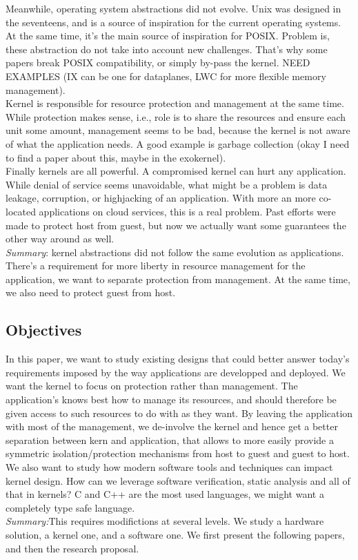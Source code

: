 Meanwhile, operating system abstractions did not evolve.
Unix was designed in the seventeens, and is a source of inspiration for the current operating systems.
At the same time, it's the main source of inspiration for POSIX.
Problem is, these abstraction do not take into account new challenges.
That's why some papers break POSIX compatibility, or simply by-pass the kernel.
NEED EXAMPLES (IX can be one for dataplanes, LWC for more flexible memory management).\\

Kernel is responsible for resource protection and management at the same time.
While protection makes sense, i.e., role is to share the resources and ensure each unit some amount,
management seems to be bad, because the kernel is not aware of what the application needs.
A good example is garbage collection (okay I need to find a paper about this, maybe in the exokernel).\\

Finally kernels are all powerful. A compromised kernel can hurt any application.
While denial of service seems unavoidable, what might be a problem is data leakage, corruption, or highjacking of an application.
With more an more co-located applications on cloud services, this is a real problem.
Past efforts were made to protect host from guest, but now we actually want some guarantees the other way around as well.\\

\textit{Summary}: kernel abstractions did not follow the same evolution as applications.
There's a requirement for more liberty in resource management for the application, we want to separate protection from management.
At the same time, we also need to protect guest from host.

\subsection{Objectives}
 In this paper, we want to study existing designs that could better answer today's requirements imposed by the way applications are developped and deployed.
 We want the kernel to focus on protection rather than management.
 The application's knows best how to manage its resources, and should therefore be given access to such resources to do with as they want.
 By leaving the application with most of the management, we de-involve the kernel and hence get a better separation between kern and application, that allows to more easily provide a symmetric isolation/protection mechanisms from host to guest and guest to host.
 We also want to study how modern software tools and techniques can impact kernel design.
 How can we leverage software verification, static analysis and all of that in kernels? 
 C and C++ are the most used languages, we might want a completely type safe language.\\

 \textit{Summary:}This requires modifictions at several levels.
 We study a hardware solution, a kernel one, and a software one.
 We first present the following papers, and then the research proposal.


 
